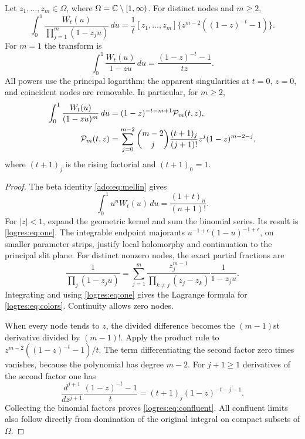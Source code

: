 \begin{theorem}
\label{logres:thm:colors}
Let $z_1,\ldots,z_m\in\Omega$, where $\Omega=\mathbb C\setminus[1,\infty)$.
For distinct nodes and $m\ge2$,
\begin{equation}\label{logres:eq:colors}
 \int_0^1\frac{W_t(u)}{\prod_{j=1}^m(1-z_ju)}\,du
 =\frac1t[z_1,\ldots,z_m]
       \{z^{m-2}((1-z)^{-t}-1)\}.
\end{equation}
For $m=1$ the transform is
\begin{equation}\label{logres:eq:one}
 \int_0^1\frac{W_t(u)}{1-zu}\,du
       =\frac{(1-z)^{-t}-1}{tz}.
\end{equation}
All powers use the principal logarithm; the apparent singularities at
$t=0$, $z=0$, and coincident nodes are removable. In particular, for
$m\ge2$,
\begin{align}\label{logres:eq:confluent}
 \int_0^1\frac{W_t(u)}{(1-zu)^m}\,du
 &=(1-z)^{-t-m+1}\mathcal P_m(t,z),\notag\\
 \mathcal P_m(t,z)
 &=\sum_{j=0}^{m-2}\binom{m-2}{j}
       \frac{(t+1)_j}{(j+1)!}
       z^j(1-z)^{m-2-j},
\end{align}
where $(t+1)_j$ is the rising factorial and $(t+1)_0=1$.
\end{theorem}
\begin{proof}
The beta identity \eqref{ado:eq:mellin} gives
\[
 \int_0^1u^nW_t(u)\,du=\frac{(1+t)_n}{(n+1)!}.
\]
For $|z|<1$, expand the geometric kernel and sum the binomial series.
Its result is \eqref{logres:eq:one}. The integrable endpoint majorants
$u^{-1+\epsilon}(1-u)^{-1+\epsilon}$, on smaller parameter strips,
justify local holomorphy and continuation to the principal slit plane.
For distinct nonzero nodes, the exact partial fractions are
\[
 \frac1{\prod_j(1-z_ju)}
 =\sum_{j=1}^m
   \frac{z_j^{m-1}}{\prod_{k\ne j}(z_j-z_k)}\frac1{1-z_ju}.
\]
Integrating and using \eqref{logres:eq:one} gives the Lagrange formula
for \eqref{logres:eq:colors}. Continuity allows zero nodes.

When every node tends to $z$, the divided difference becomes the
$(m-1)$st derivative divided by $(m-1)!$. Apply the product rule to
$z^{m-2}((1-z)^{-t}-1)/t$. The term differentiating the second factor
zero times vanishes, because the polynomial has degree $m-2$.
For $j+1\ge1$ derivatives of the second factor one has
\[
 \frac{d^{j+1}}{dz^{j+1}}
       \frac{(1-z)^{-t}-1}{t}
       =(t+1)_j(1-z)^{-t-j-1}.
\]
Collecting the binomial factors proves \eqref{logres:eq:confluent}.
All confluent limits also follow directly from domination of the
original integral on compact subsets of $\Omega$.
\end{proof}

